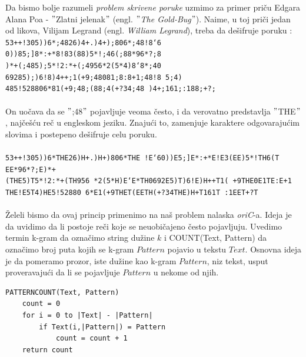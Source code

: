 Da bismo bolje razumeli \textit{problem skrivene poruke} uzmimo za primer priču Edgara Alana Poa - $"$Zlatni jelenak$"$ (engl. \textit{$"$The Gold-Bug$"$}).
Naime, u toj priči jedan od likova, Vilijam Legrand (engl. \textit{William Legrand}), treba da dešifruje poruku :\\

\texttt{53++!305))6*;4826)4+.)4+);806*;48!8`6
0))85;]8*:+*8!83(88)5*!;46(;88*96*?;8\\
)*+(;485);5*!2:*+(;4956*2(5*4)8`8*;40
69285);)6!8)4++;1(+9;48081;8:8+1;48!8
5;4)\\485!528806*81(+9;48;(88;4(+?34;48
)4+;161;:188;+?;}\\\\
On uočava da se $"$;48$"$ pojavljuje veoma često, i da verovatno predstavlja $"$THE$"$, najčešću reč u engleskom jeziku. Znajući to, zamenjuje karaktere odgovarajućim slovima i postepeno dešifruje celu poruku.\\\\
\texttt{53++!305))6*THE26)H+.)H+)806*THE
!E`60))E5;]E*:+*E!E3(EE)5*!TH6(T
EE*96*?;E)*+\\(THE5)T5*!2:*+(TH956
*2(5*H)E`E*TH0692E5)T)6!E)H++T1(
+9THE0E1TE:E+1\\THE!E5T4)HE5!52880
6*E1(+9THET(EETH(+?34THE)H+T161T
:1EET+?T}\\\\
Želeli bismo da ovaj princip primenimo na naš problem nalaska \textit{oriC}-a. Ideja je da uvidimo da li postoje reči koje se neuobičajeno često pojavljuju. Uvedimo termin k-gram da označimo string dužine $k$ i COUNT(Text, Pattern) da označimo broj puta kojih se k-gram $Pattern$ pojavio u tekstu $Text$. Osnovna ideja je da pomeramo prozor, iste dužine kao k-gram $Pattern$, niz tekst, usput proveravajući da li se pojavljuje $Pattern$ u nekome od njih. 

\begin{lstlisting}
PATTERNCOUNT(Text, Pattern)
	count = 0
	for i = 0 to |Text| - |Pattern|
		if Text(i,|Pattern|) = Pattern
			count = count + 1 
	return count
\end{lstlisting}
	
